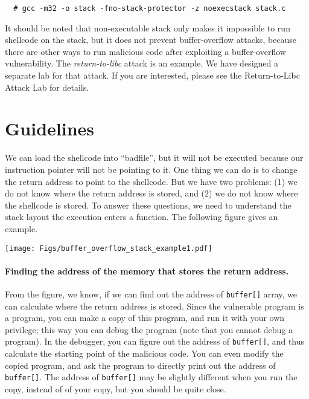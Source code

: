 \begin{verbatim}
  # gcc -m32 -o stack -fno-stack-protector -z noexecstack stack.c
\end{verbatim}


It should be noted that non-executable stack only makes it impossible to run shellcode 
on the stack, but it does not prevent buffer-overflow attacks, 
because there are other ways to run malicious code after exploiting 
a buffer-overflow vulnerability. The {\em return-to-libc} attack
is an example. We have designed a separate lab for that 
attack. If you are interested, please see the 
Return-to-Libc Attack Lab for details.



\section{Guidelines}

We can load the shellcode into ``badfile'', but it will not be executed because our
instruction pointer will not be pointing to it. One thing we can do is to change
the return address to point to the shellcode. But we have two problems:
(1) we do not know where the return address is stored, and
(2) we do not know where the shellcode is stored.
To answer these questions, we need to understand the stack layout the 
execution enters a function. The following figure gives 
an example.


\hspace{-0.5in}
\texttt{[image: Figs/buffer\_overflow\_stack\_example1.pdf]}


\paragraph{Finding the address of the memory that stores the return address.}
From the figure, we know, if we can find out the address of {\tt buffer[]} array, 
we can calculate where the return address is stored. 
Since the vulnerable program is a \setuid program, you can make a copy of this program,
and run it with your own privilege; this way you can debug the program (note that
you cannot debug a \setuid program). In the debugger, you can figure out
the address of {\tt buffer[]}, and thus calculate the starting point of
the malicious code. You can even modify the copied program, and ask the 
program to directly print out the address of {\tt buffer[]}.
The address of {\tt buffer[]} may be slightly
different when you run the \setuid copy, instead of of your copy, but
you should be quite close. 


